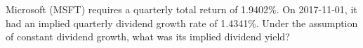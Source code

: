 Microsoft (MSFT) requires a quarterly total return of 1.9402\%. On 2017-11-01, it had an implied quarterly dividend growth rate of 1.4341\%. Under the assumption of constant dividend growth, what was its implied dividend yield?
